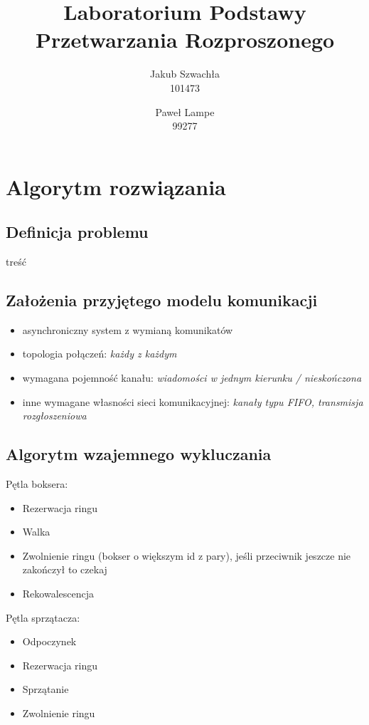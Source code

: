 \documentclass{article}
\title{\textbf{Laboratorium Podstawy Przetwarzania Rozproszonego}}
\author{Jakub Szwachła \\ 101473 \and  Paweł Lampe \\ 99277}
\begin{document}
\maketitle

\section{Algorytm rozwiązania}
\subsection{Definicja problemu}
treść

\subsection{Założenia przyjętego modelu komunikacji}
\begin{itemize}
\item asynchroniczny system z wymianą komunikatów
\item topologia połączeń: \emph{każdy z każdym}
\item wymagana pojemność kanału:  \emph{wiadomości w jednym kierunku / nieskończona}
\item inne wymagane własności sieci komunikacyjnej: \emph{kanały typu FIFO, transmisja rozgłoszeniowa}
\end{itemize}

\subsection{Algorytm wzajemnego wykluczania}

Pętla boksera:
\begin{itemize}
    \item Rezerwacja ringu
    \item Walka
    \item Zwolnienie ringu (bokser o większym id z pary), jeśli
    przeciwnik jeszcze nie zakończył to czekaj
    \item Rekowalescencja
\end{itemize}

Pętla sprzątacza:
\begin{itemize}
    \item Odpoczynek
    \item Rezerwacja ringu
    \item Sprzątanie
    \item Zwolnienie ringu
\end{itemize}
\end{document}
